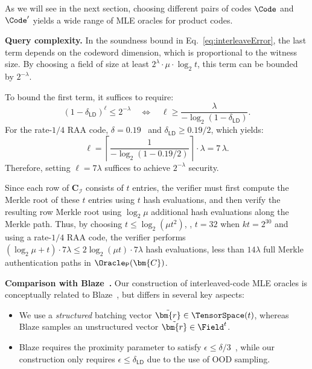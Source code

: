 As we will see in the next section, choosing different pairs of codes
$\Code$ and $\Code'$ yields a wide range of MLE oracles for product codes.

\medskip
\noindent
{\bf Query complexity.}
In the soundness bound in Eq.~\eqref{eq:interleaveError},
the last term depends on the codeword dimension, which is proportional to the witness size.
By choosing a field of size at least $2^\lambda \cdot \mu \cdot \log_2 t$,
this term can be bounded by $2^{-\lambda}$.

To bound the first term, it suffices to require:
\[
    (1-\delta_\mathsf{LD})^{\ell} \le 2^{-\lambda}
    \quad\Longleftrightarrow\quad
    \ell \ge \frac{\lambda}{-\log_2(1-\delta_\mathsf{LD})}.
\]
For the rate-$1/4$ RAA code, $\delta = 0.19$~\cite{eurocrypt/BrehmCFRRZ25} and $\delta_\mathsf{LD} \ge 0.19/2$,
which yields:
\[
    \ell
    = \left\lceil \frac{1}{-\log_2(1-0.19/2)} \right\rceil \cdot \lambda
    = 7\,\lambda.
\]
Therefore, setting $\ell = 7\lambda$ suffices to achieve $2^{-\lambda}$ security.

Since each row of $\bm{C}_{\mathcal{I}}$ consists of $t$ entries,
the verifier must first compute the Merkle root of these $t$ entries using $t$ hash evaluations,
and then verify the resulting row Merkle root using $\log_2 \mu$ additional hash evaluations along the Merkle path.
Thus, by choosing $t \le \log_2(\mu t^2)$, \eg, $t=32$ when $kt = 2^{30}$ and using a rate-$1/4$ RAA code,
the verifier performs $(\log_2 \mu + t)\cdot 7\lambda \le 2\log_2 (\mu t)\cdot 7\lambda$ hash evaluations, less than $14\lambda$ full Merkle authentication paths in $\Oracle_\mathsf{P}(\bm{C})$.

\medskip
\noindent
\textbf{Comparison with Blaze~\cite{eurocrypt/BrehmCFRRZ25}.}
Our construction of interleaved-code MLE oracles is conceptually related to
Blaze~\cite{eurocrypt/BrehmCFRRZ25}, but differs in several key aspects:
\begin{itemize}
    \item We use a \emph{structured} batching vector
    $\tilde{\bm{r}} \in \TensorSpace(t)$,
    whereas Blaze samples an unstructured vector
    $\tilde{\bm{r}} \in \Field^t$.
    \item Blaze requires the proximity parameter to satisfy
    $\epsilon \le \delta/3$~\cite[Lemma~6.1]{eurocrypt/BrehmCFRRZ25},
    while our construction only requires
    $\epsilon \le \delta_{\mathsf{LD}}$ due to the use of OOD sampling.
\end{itemize}

